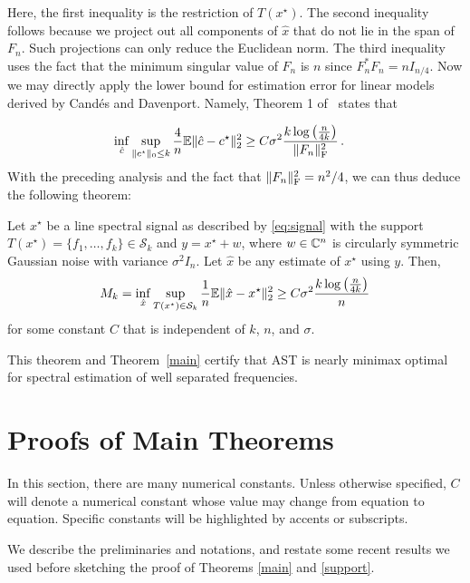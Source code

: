 Here, the first inequality is the restriction of $T(x^\star)$. The second
inequality follows because we project out all components of $\hat{x}$ that do
not lie in the span of $F_n$. Such projections can only reduce the Euclidean
norm. The third inequality uses the fact that the minimum singular value of
$F_n$ is $n$ since $F_n^*F_n = n I_{{n}/{4}}$. Now we may directly apply the
lower bound for estimation error for linear models derived by Cand\'es and
Davenport. Namely, Theorem 1 of~\cite{cd_minimax} states that

\begin{align*}
\inf_{\hat{c}}
 \sup_{\lVert c^\star\rVert_0 \leq k} \frac{4}{n} \mathbb{E} \lVert\hat{c} - c^\star\rVert_2^2&\geq {C} \sigma^2 \frac{k \log\left(\frac{n}{4k}\right)}{\lVert F_n\rVert_\mathrm{F}^2}\,.
 \end{align*} With the preceding analysis and the fact that $\lVert F_n\rVert_{\mathrm{F}}^2 = n^2/4$, we can thus deduce the following theorem:
 \begin{theorem}
\label{minimax}
Let $x^\star$ be a line spectral signal as described by \eqref{eq:signal} with the support $T(x^\star) = \{f_1, \dots, f_k\} \in \mathcal{S}_k$ and $y = x^\star + w$, where $w \in \mathbb{C}^n$ is circularly symmetric Gaussian noise with variance $\sigma^2 I_n$. Let $\hat{x}$ be any estimate of $x^\star$ using $y$. Then,
\[
M_k = \inf_{\hat{x}}
 \sup_{
	T(x^\star) \in \mathcal{S}_k}
\frac{1}{n} \mathbb{E} \lVert\hat{x} - x^\star\rVert_2^2
\geq C\sigma^2 \frac{k \log\left(\frac{n}{4k}\right)}{n}
\]
for some constant $C$ that is independent of $k$, $n$, and $\sigma$.
\end{theorem}

This theorem and Theorem~\ref{main} certify that AST is nearly minimax optimal for spectral estimation of well separated frequencies. 



\section{Proofs of Main Theorems}
\label{sec:proofs}

In this section, there are many numerical constants.  Unless otherwise specified, $C$ will denote a numerical constant whose value may change from equation to equation.  Specific constants will be highlighted by accents or subscripts.

We describe the preliminaries and notations, and restate some recent results we used 
before sketching the proof of Theorems \ref{main} and \ref{support}.

